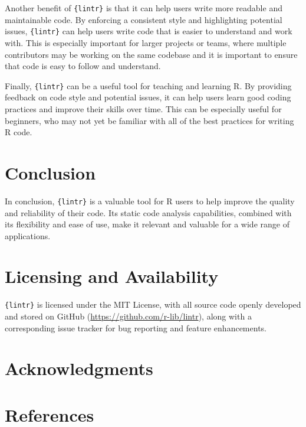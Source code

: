 \documentclass[10pt,a4paper,onecolumn]{article}
\begin{document}
Another benefit of \texttt{\{lintr\}} is that it can help users write
more readable and maintainable code. By enforcing a consistent style and
highlighting potential issues, \texttt{\{lintr\}} can help users write
code that is easier to understand and work with. This is especially
important for larger projects or teams, where multiple contributors may
be working on the same codebase and it is important to ensure that code
is easy to follow and understand.

Finally, \texttt{\{lintr\}} can be a useful tool for teaching and
learning R. By providing feedback on code style and potential issues, it
can help users learn good coding practices and improve their skills over
time. This can be especially useful for beginners, who may not yet be
familiar with all of the best practices for writing R code.

\hypertarget{conclusion}{%
\section{Conclusion}\label{conclusion}}

In conclusion, \texttt{\{lintr\}} is a valuable tool for R users to help
improve the quality and reliability of their code. Its static code
analysis capabilities, combined with its flexibility and ease of use,
make it relevant and valuable for a wide range of applications.

\hypertarget{licensing-and-availability}{%
\section{Licensing and Availability}\label{licensing-and-availability}}

\texttt{\{lintr\}} is licensed under the MIT License, with all source
code openly developed and stored on GitHub
(\url{https://github.com/r-lib/lintr}), along with a corresponding issue
tracker for bug reporting and feature enhancements.

\hypertarget{acknowledgments}{%
\section{Acknowledgments}\label{acknowledgments}}

\hypertarget{references}{%
\section*{References}\label{references}}
\end{document}
